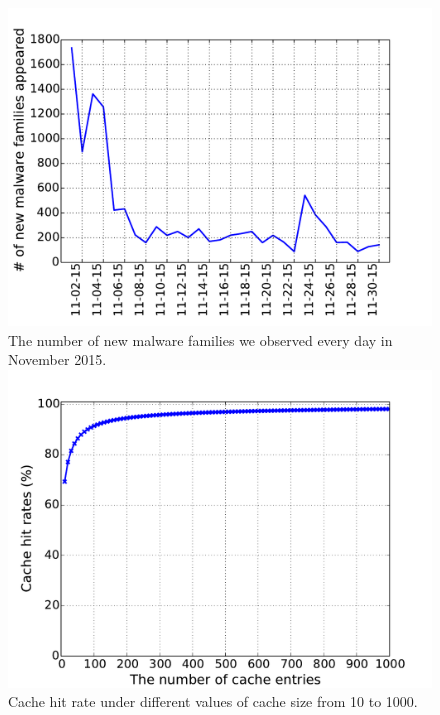 
\begin{figure}[!htb]
  \includegraphics[width=\linewidth]{figure/new_family}
{
The number of new malware families we observed every day in November 2015.
}
\endminipage\hfill
{}
  \includegraphics[width=\linewidth]{figure/LRU}
{Cache hit rate under different values of cache size from 10 to 1000.}
\endminipage\hfill
{}%

\end{figure}
